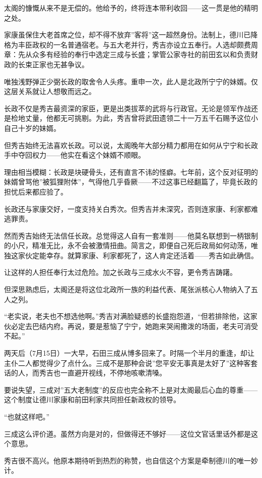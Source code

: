 \documentclass[
]{book}
\begin{document}
太阁的慷慨从来不是无偿的。他给予的，终将连本带利收回------这一贯是他的精明之处。

家康虽保住大老首席之位，却不得不放弃''客将''这一超然身份。法制上，德川已降格为丰臣政权的一名普通宿老。与五大老并行，秀吉亦设立五奉行。人选却颇费周章：先从众多有经验的奉行中选定三成与长盛；掌管公家寺社的前田玄以和负责财政的长束正家也无甚争议。

唯独浅野弹正少弼长政的取舍令人头疼。重申一次，此人是北政所宁宁的妹婿。仅这层关系就让人想敬而远之。

长政不仅是秀吉最资深的家臣，更是出类拔萃的武将与行政官。无论是领军作战还是检地丈量，他都无可挑剔。为此，秀吉曾将武田遗领二十一万五千石赐予这位小自己十岁的妹婿。

但秀吉始终无法喜欢长政。可以说，太阁晚年大部分精力都用在如何从宁宁和长政手中夺回权力------他实在看这个妹婿不顺眼。

理由相当模糊：长政是块硬骨头，还有直言不讳的怪癖。七年前，这个反对征明的妹婿曾骂他''被狐狸附体''，气得他几乎昏厥------不过这事已经翻篇了，毕竟长政的担忧后来都应验了。

长政还与家康交好，一度支持关白秀次。但秀吉并未深究，否则连家康、利家都难逃罪责。

然而秀吉始终无法信任长政。总觉得这人自有一套准则------他莫名联想到一柄银制的小尺，精准无比，永不会被激情扭曲。简言之，即便自己死后政局如何动荡，唯独这家伙定能幸存。就算家康、利家都死了，这人肯定还活着------秀吉如此确信。

让这样的人担任奉行太过危险。加之长政与三成水火不容，更令秀吉踌躇。

但深思熟虑后，太阁还是将这位北政所一族的利益代表、尾张派核心人物纳入了五人之列。

``老实说，老夫也不想选他啊。''秀吉对满脸疑惑的长盛抱怨道，``但若排除他，这家伙必定去巴结内府。再说，要是惹恼了宁宁，她跑来哭闹撒泼的场面，老夫可消受不起。''

两天后（7月15日）一大早，石田三成从博多回来了。时隔一个半月的重逢，却让主仆二人都觉得少了点什么。三成不是那种会说''您平安无事真是太好了''这种客套话的人，而秀吉也一直避开视线，不停地咳嗽清嗓。

要说失望，三成对''五大老制度''的反应也完全称不上是对太阁最后心血的尊重------这个制度让德川家康和前田利家共同担任新政权的领导。

``也就这样吧。''

三成这么评价道。虽然方向是对的，但做得还不够好------这位文官话里话外都是这个意思。

秀吉很不高兴。他原本期待听到热烈的称赞，也自信这个方案是牵制德川的唯一妙计。
\end{document}
